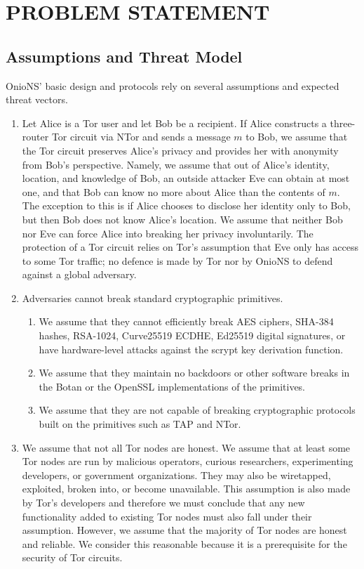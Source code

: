 
\chapter{PROBLEM STATEMENT}

\section{Assumptions and Threat Model}
\label{sec:Assumptions}

OnioNS' basic design and protocols rely on several assumptions and expected threat vectors.

\begin{enumerate}
	\item Let Alice is a Tor user and let Bob be a recipient. If Alice constructs a three-router Tor circuit via NTor and sends a message $ m $ to Bob, we assume that the Tor circuit preserves Alice's privacy and provides her with anonymity from Bob's perspective. Namely, we assume that out of Alice's identity, location, and knowledge of Bob, an outside attacker Eve can obtain at most one, and that Bob can know no more about Alice than the contents of $ m $. The exception to this is if Alice chooses to disclose her identity only to Bob, but then Bob does not know Alice's location. We assume that neither Bob nor Eve can force Alice into breaking her privacy involuntarily. The protection of a Tor circuit relies on Tor's assumption that Eve only has access to some Tor traffic; no defence is made by Tor nor by OnioNS to defend against a global adversary.
	\item Adversaries cannot break standard cryptographic primitives.
		\begin{enumerate}
			\item We assume that they cannot efficiently break AES ciphers, SHA-384 hashes, RSA-1024, Curve25519 ECDHE, Ed25519 digital signatures, or have hardware-level attacks against the scrypt key derivation function.
			\item We assume that they maintain no backdoors or other software breaks in the Botan or the OpenSSL implementations of the primitives.
			\item We assume that they are not capable of breaking cryptographic protocols built on the primitives such as TAP and NTor.
		\end{enumerate}
	\item We assume that not all Tor nodes are honest. We assume that at least some Tor nodes are run by malicious operators, curious researchers, experimenting developers, or government organizations. They may also be wiretapped, exploited, broken into, or become unavailable. This assumption is also made by Tor's developers and therefore we must conclude that any new functionality added to existing Tor nodes must also fall under their assumption. However, we assume that the majority of Tor nodes are honest and reliable. We consider this reasonable because it is a prerequisite for the security of Tor circuits.

\end{enumerate}
